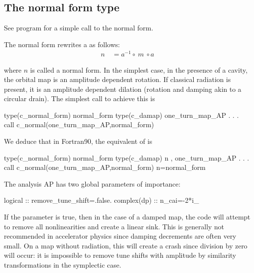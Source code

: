 \documentclass{hitec}     %
\def\tc{https://twikinew.ihep.ac.cn/pubfppptc/Web/Programs/}
\begin{document}
{{{{{{{{{{{{{{{{{{  
  \subsection{ The normal form type}\label{s:normalform}
  
  See program \href{\tc z_track_normal_tpsa.f90}{}    for a simple call to the normal form.

  
  The normal form rewrites a  as follows:
%
\begin{align} n\ &={a}^{-1}\circ \ m\ \circ a \label{eq:normalf}\end{align}

where $n$ is called a normal form. In the simplest case, in the presence of a cavity, the orbital map is an amplitude dependent rotation. If classical radiation is present, it is an amplitude dependent dilation (rotation and damping akin to a circular drain).  The simplest call to achieve this is

\begin{code}
type(c_normal_form) normal_form
type(c_damap)  one_turn_map_AP
	.
	.
	.
call c_normal(one_turn_map_AP,normal_form)
\end{code}

We deduce that in Fortran90,   the equivalent of  is 
\begin{code}
type(c_normal_form) normal_form
type(c_damap) n , one_turn_map_AP
	.
	.
	.
call c_normal(one_turn_map_AP,normal_form)
n=normal_form%
\end{code}


The analysis AP has two global parameters of importance:

\begin{code}
logical :: remove_tune_shift=.false.
complex(dp) :: n_cai=-2*i_
\end{code}
  
If the parameter   is true, then in the case of a damped map, the code will attempt to remove all nonlinearities and create a linear sink. This is generally not recommended in accelerator physics since damping decrements are often very small. On a map without radiation, this will create a crash since division by zero will occur: it is impossible to remove tune shifts with amplitude by similarity transformations in the symplectic case.

}}}}}}}}}}}}}}}}}}
\end{document}
